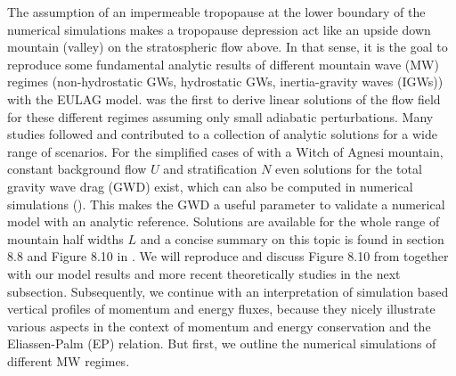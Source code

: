 The assumption of an impermeable tropopause at the lower boundary of the numerical simulations makes a tropopause depression act like an upside down mountain (valley) on the stratospheric flow above. In that sense, it is the goal to reproduce some fundamental analytic results of different mountain wave (MW) regimes (non-hydrostatic GWs, hydrostatic GWs, inertia-gravity waves (IGWs)) with the EULAG model. \textcite{queney_problem_1948} was the first to derive linear solutions of the flow field for these different regimes assuming only small adiabatic perturbations. Many studies followed and contributed to a collection of analytic solutions for a wide range of scenarios. For the simplified cases of \textcite{queney_problem_1948} with a Witch of Agnesi mountain, constant background flow $U$ and stratification $N$ even solutions for the total gravity wave drag (GWD) exist, which can also be computed in numerical simulations (\cite[]{teixeira_physics_2014}). This makes the GWD a useful parameter to validate a numerical model with an analytic reference. Solutions are available for the whole range of mountain half widths $L$ and a concise summary on this topic is found in section 8.8 and Figure 8.10 in \textcite{gill_atmosphere-ocean_1982}. We will reproduce and discuss Figure 8.10 from \textcite[]{gill_atmosphere-ocean_1982} together with our model results and more recent theoretically studies in the next subsection. Subsequently, we continue with an interpretation of simulation based vertical profiles of momentum and energy fluxes, because they nicely illustrate various aspects in the context of momentum and energy conservation and the Eliassen-Palm (EP) relation. But first, we outline the numerical simulations of different MW regimes.

